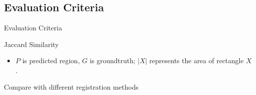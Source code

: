\documentclass[xcolor=table,compress,blue]{beamer}
\begin{document}
\subsection{Evaluation Criteria}
\begin{frame}{Evaluation Criteria}
	\begin{exampleblock}{Jaccard Similarity}
		\begin{itemize}
			\item \footnotesize{$P$ is predicted region, 
				$G$ is groundtruth; $|X|$ represents the area of rectangle $X$.}
		\end{itemize}
	\end{exampleblock}
	\begin{exampleblock}{Compare with different registration methods}
	\end{exampleblock}
\end{frame}
\end{document}
